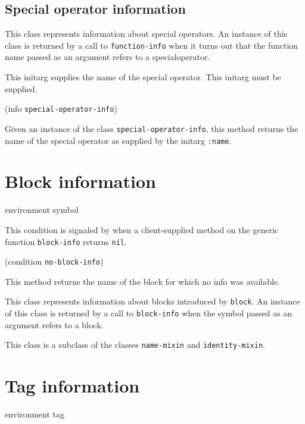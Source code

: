 \subsection{Special operator information}


This class represents information about special operators.  An
instance of this class is returned by a call to \texttt{function-info}
when it turns out that the function name passed as an argument refers
to a specialoperator.


This initarg supplies the name of the special operator.  This initarg
must be supplied.

 {(info {\tt special-operator-info})}

Given an instance of the class \texttt{special-operator-info}, this
method returns the name of the special operator as supplied by the
initarg \texttt{:name}.

\section{Block information}

 {environment symbol}


This condition is signaled by \sysname{} when a client-supplied method
on the generic function \texttt{block-info} returns \texttt{nil}.

 {(condition {\tt no-block-info})}

This method returns the name of the block for which no info was
available. 


This class represents information about blocks introduced by
\texttt{block}.  An instance of this class is returned by a call to
\texttt{block-info} when the symbol passed as an argument refers to a
block.

This class is a subclass of the classes \texttt{name-mixin} and
\texttt{identity-mixin}.

\section{Tag information}

 {environment tag}


